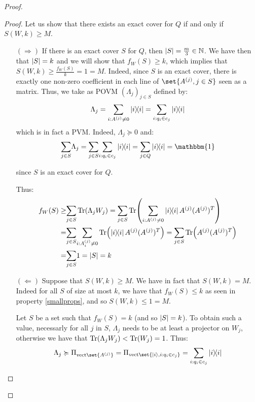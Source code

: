 \documentclass{article}
\theoremstyle{definition}
\theoremstyle{remark}
\begin{document}
\begin{proof}
\begin{proof}
       Let us show that there exists an exact cover for $Q$ if and only if $S(W,k) \geq M$.

       \begin{itemize}
       \item[$(\Rightarrow)$] If there is an exact cover $S$ for $Q$, then $\abs{S}=\frac{m}{3} \in \mathbb{N}$. We have then that $\abs{S}=k$ and we will show that $f_W(S) \geq k$, which implies that $S(W,k) \geq \frac{f_W(S)}{k} = 1 = M$. Indeed, since $S$ is an exact cover, there is exactly one non-zero coefficient in each line of $\set{A^{(j)},j \in S}$ seen as a matrix. Thus, we take as POVM $(\Lambda_j)_{j \in S}$ defined by:
         \[\Lambda_j = \underset{i:A^{(j)} \not= 0}{\sum} \dyad{i} = \underset{i:q_i \in c_j}{\sum} \dyad{i} \]
         which is in fact a PVM. Indeed, $\Lambda_j \succcurlyeq 0$ and:
         \[\underset{j \in S}{\sum} \Lambda_j = \underset{j \in S}{\sum} \underset{i:q_i \in c_j}{\sum} \dyad{i} =  \underset{j \in Q}{\sum} \dyad{i} = \mathbbm{1}\]

         since $S$ is an exact cover for $Q$.

         Thus:
         \begin{equation}
           \begin{aligned}
             f_W(S) \geq& \underset{j \in S}{\sum} \Tr(\Lambda_j W_j) = \underset{j \in S}{\sum} \Tr(\underset{i:A^{(j)} \not= 0}{\sum} \dyad{i} A^{(j)}(A^{(j)})^T)\\
             =&  \underset{j \in S}{\sum} \underset{i:A^{(j)}_i \not= 0}{\sum} \Tr(\dyad{i} A^{(j)}(A^{(j)})^T) = \underset{j \in S}{\sum} \Tr(A^{(j)}(A^{(j)})^T)\\
             =& \underset{j \in S}{\sum} 1 = \abs{S} = k
           \end{aligned}
         \end{equation}
     
       \item[$(\Leftarrow)$] Suppose that $S(W,k) \geq M$. We have in fact that $S(W,k) = M$. Indeed for all $S$ of size at most $k$, we have that $f_W(S) \leq k$ as seen in property \ref{smallprops}, and so $S(W,k) \leq 1 = M$.

         Let $S$ be a set such that $f_W(S) = k$ (and so $\abs{S}=k$). To obtain such a value, necessarly for all $j$ in $S$, $\Lambda_j$ needs to be at least a projector on $W_j$, otherwise we have that $\Tr(\Lambda_j W_j) < \Tr(W_j) = 1$. Thus:
         \[\Lambda_j \succcurlyeq \Pi_{\text{vect}\set{A^{(j)}}} = \Pi_{\text{vect}\set{\ket{i}, i:q_i \in c_j}} = \underset{i:q_i \in c_j}{\sum} \dyad{i}\]


\end{itemize}
\end{proof}
\end{proof}
\end{document}
